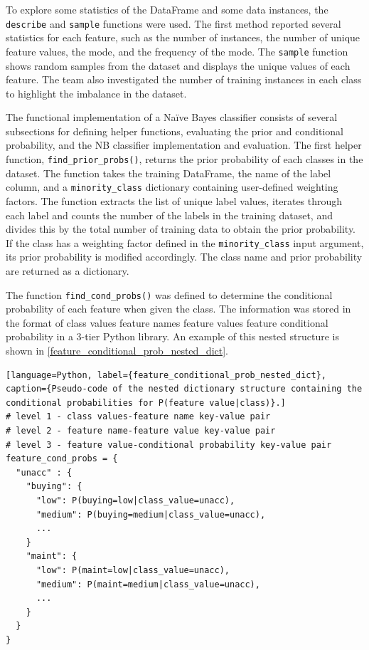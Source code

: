 \documentclass[a4paper]{article}
\begin{document}
To explore some statistics of the DataFrame and some data instances, the \lstinline{describe} and \lstinline{sample} functions were used. The first method reported several statistics for each feature, such as the number of instances, the number of unique feature values, the mode, and the frequency of the mode. The \lstinline{sample} function shows random samples from the dataset and displays the unique values of each feature. The team also investigated the number of training instances in each class to highlight the imbalance in the dataset.

The functional implementation of a Naïve Bayes classifier consists of several subsections for defining helper functions, evaluating the prior and conditional probability, and the NB classifier implementation and evaluation. The first helper function, \lstinline{find_prior_probs()}, returns the prior probability of each classes in the dataset. The function takes the training DataFrame, the name of the label column, and a \lstinline{minority_class} dictionary containing user-defined weighting factors. The function extracts the list of unique label values, iterates through each label and counts the number of the labels in the training dataset, and divides this by the total number of training data to obtain the prior probability. If the class has a weighting factor defined in the \lstinline{minority_class} input argument, its prior probability is modified accordingly. The class name and prior probability are returned as a dictionary.

The function \lstinline{find_cond_probs()} was defined to determine the conditional probability of each feature when given the class. The information was stored in the format of class values \> feature names \> feature values \> feature conditional probability in a 3-tier Python library. An example of this nested structure is shown in \autoref{feature_conditional_prob_nested_dict}.

\begin{lstlisting}[language=Python, label={feature_conditional_prob_nested_dict}, caption={Pseudo-code of the nested dictionary structure containing the conditional probabilities for P(feature value|class)}.]
# level 1 - class values-feature name key-value pair
# level 2 - feature name-feature value key-value pair
# level 3 - feature value-conditional probability key-value pair
feature_cond_probs = {                    
  "unacc" : {                             
    "buying": {                           
      "low": P(buying=low|class_value=unacc),
      "medium": P(buying=medium|class_value=unacc),
      ...
    }
    "maint": {
      "low": P(maint=low|class_value=unacc),
      "medium": P(maint=medium|class_value=unacc),
      ...
    }
  }
}
\end{lstlisting}
\end{document}
